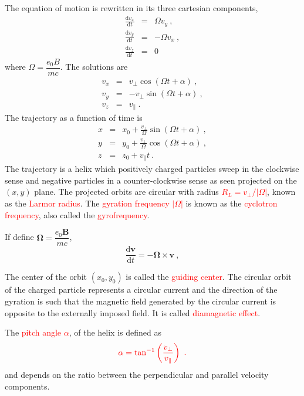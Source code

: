 \documentclass[12pt,a4paper]{article}
\renewcommand{\vec}[1]{\boldsymbol{#1}}
\newcommand{\dif}{\mathrm{d}}
\begin{document}
The equation of motion is rewritten in its three cartesian components, 
\begin{eqnarray*}
\frac{\dif v_x}{\dif t} &=& \Omega v_y ~, \\
\frac{\dif v_y}{\dif t} &=& -\Omega v_x ~, \\
\frac{\dif v_z}{\dif t} &=& 0
\end{eqnarray*}
where $\Omega = \dfrac{e_0 B}{mc}$. The solutions are
\begin{eqnarray*}
v_x &=& v_\perp \cos (\Omega t+ \alpha) ~, \\
v_y &=& -v_\perp \sin (\Omega t+ \alpha) ~, \\
v_z &=& v_\parallel ~.
\end{eqnarray*}
The trajectory as a function of time is
\begin{eqnarray*}
x &=& x_0 + \frac{v_\perp}{\Omega} \sin (\Omega t+ \alpha) ~, \\
y &=& y_0 + \frac{v_\perp}{\Omega} \cos (\Omega t+ \alpha) ~, \\
z &=& z_0 +v_\parallel t ~.
\end{eqnarray*}
The trajectory is a helix which positively charged particles sweep in the clockwise sense and negative particles in a counter-clockwise sense as seen projected on the $(x, y)$ plane. The projected orbits are circular with radius \textcolor{red}{$R_L = v_\perp/|\Omega|$}, known as the \textcolor{red}{Larmor radius}. The \textcolor{red}{gyration frequency $|\Omega|$} is known as the \textcolor{red}{cyclotron frequency}, also called the \textcolor{red}{gyrofrequency}.

If define $\vec{\Omega} = \dfrac{e_0\vec{B} }{mc}$,
\begin{equation}
\frac{\dif \vec{v} }{\dif t} = -\vec{\Omega} \times \vec{v} ~,
\end{equation}

\cite{1996bspp.book.....B} The center of the orbit $(x_0, y_0)$ is called the \textcolor{red}{guiding center}. The circular orbit of the charged particle represents a circular current and the direction of the gyration is such that the magnetic field generated by the circular current is opposite to the externally imposed field. It is called \textcolor{red}{diamagnetic effect}.

The \textcolor{red}{pitch angle $\alpha$}, of the helix is defined as
\begin{equation}
\color{red} \alpha = \tan^{-1} \left(\frac{v_\perp}{v_\parallel} \right) ~.
\end{equation}
and depends on the ratio between the perpendicular and parallel velocity components.
\end{document}
